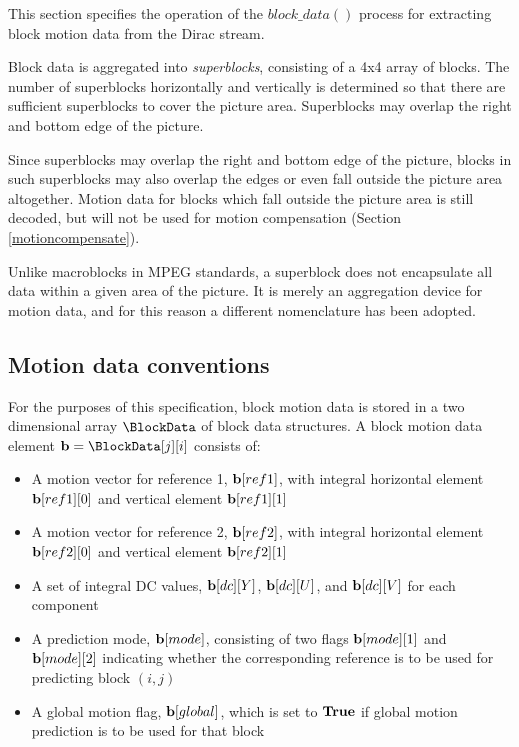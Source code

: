 
\label{motiondec}

This section specifies the operation of the $block\_data()$ process for extracting
block motion data from the Dirac stream. 

Block data is aggregated into {\em superblocks}, consisting of a 4x4 array of blocks. The number 
of superblocks horizontally and vertically is determined so that there are sufficient superblocks
to cover the picture area. Superblocks may overlap the right and bottom edge of the picture.

\begin{informative}
Since superblocks may overlap the right and bottom edge of the picture, blocks in such superblocks
may also overlap the edges or even fall outside the picture area altogether. Motion data for 
blocks which fall outside the picture area is still decoded, but will not be used for motion compensation 
(Section \ref{motioncompensate}). 

Unlike macroblocks in MPEG standards, a superblock does not encapsulate all data within a 
given area of the picture. It is merely an aggregation device for motion data, and for this reason
a different nomenclature has been adopted.
\end{informative}

\subsection{Motion data conventions}

\label{motionconventions}

For the purposes of this specification, block motion data is stored in a two dimensional array 
$\BlockData$ of block data structures. A block motion data element ${\bf b}=\BlockData[j][i]$ consists of:

\begin{itemize}
\item A motion vector for reference 1, ${\bf b}[ref1]$, with integral horizontal element ${\bf b}[ref1][0]$ and 
vertical element ${\bf b}[ref1][1]$
\item A motion vector for reference 2, ${\bf b}[ref2]$, with integral horizontal element ${\bf b}[ref2][0]$ and 
vertical element ${\bf b}[ref2][1]$
\item A set of integral DC values, ${\bf b}[dc][Y]$, ${\bf b}[dc][U]$, and ${\bf b}[dc][V]$ for each component
\item A prediction mode, ${\bf b}[mode]$, consisting of two flags ${\bf b}[mode][1]$ and ${\bf b}[mode][2]$ 
indicating whether the corresponding reference is to be used for predicting block $(i,j)$
\item A global motion flag, ${\bf b}[global]$, which is set to $\text{\bf{True}}$ if global motion prediction is to be used for
that block
\end{itemize}

